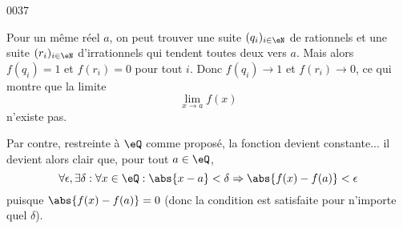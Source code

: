 
\begin{corrige}{0037}

Pour un même réel $a$, on peut trouver une suite $(q_i)_{i\in\eN}$ de rationnels et une suite $(r_i)_{i\in\eN}$ d'irrationnels qui tendent toutes deux vers $a$. Mais alors $f(q_i) = 1$ et $f(r_i) = 0$ pour tout $i$. Donc $f(q_i) \to 1$ et $f(r_i) \to 0$, ce qui montre que la limite
\begin{equation*}
	\lim_{x\to a} f(x)
\end{equation*}
n'existe pas.

Par contre, restreinte à $\eQ$ comme proposé, la fonction devient
constante... il devient alors clair que, pour tout $a \in \eQ$,
\begin{equation*}
  \forall \epsilon, \exists \delta : \forall x \in \eQ : \abs{x-a} <
  \delta \Rightarrow \abs{f(x) - f(a)} < \epsilon
\end{equation*}
puisque $\abs{f(x) - f(a)} = 0$ (donc la condition est satisfaite pour
n'importe quel $\delta$).


\end{corrige}
